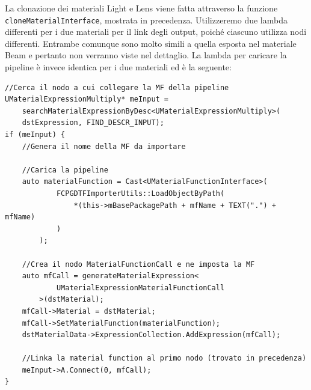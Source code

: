\documentclass[main.tex]{subfiles}
\begin{document}
\noindent La clonazione dei materiali Light e Lens viene fatta attraverso la funzione \lstinline{cloneMaterialInterface}, mostrata in precedenza. Utilizzeremo due lambda differenti per i due materiali per il link degli output, poiché ciascuno utilizza nodi differenti. Entrambe comunque sono molto simili a quella esposta nel materiale Beam e pertanto non verranno viste nel dettaglio. La lambda per caricare la pipeline è invece identica per i due materiali ed è la seguente:
\begin{lstlisting}
//Cerca il nodo a cui collegare la MF della pipeline
UMaterialExpressionMultiply* meInput =
    searchMaterialExpressionByDesc<UMaterialExpressionMultiply>(
    dstExpression, FIND_DESCR_INPUT);
if (meInput) {
    //Genera il nome della MF da importare

    //Carica la pipeline
    auto materialFunction = Cast<UMaterialFunctionInterface>(
            FCPGDTFImporterUtils::LoadObjectByPath(
                *(this->mBasePackagePath + mfName + TEXT(".") + mfName)
            )
        );

    //Crea il nodo MaterialFunctionCall e ne imposta la MF
    auto mfCall = generateMaterialExpression<
            UMaterialExpressionMaterialFunctionCall
        >(dstMaterial);
    mfCall->Material = dstMaterial;
    mfCall->SetMaterialFunction(materialFunction);
    dstMaterialData->ExpressionCollection.AddExpression(mfCall);

    //Linka la material function al primo nodo (trovato in precedenza)
    meInput->A.Connect(0, mfCall);
}
\end{lstlisting}
\end{document}

